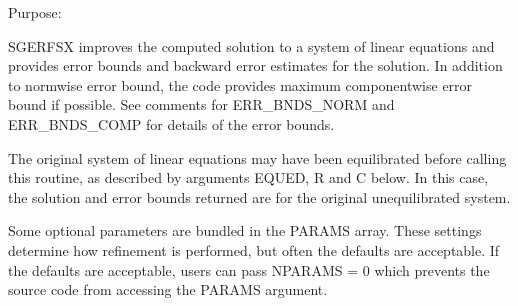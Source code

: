  \begin{DoxyParagraph}{Purpose\+: }
\begin{DoxyVerb}    SGERFSX improves the computed solution to a system of linear
    equations and provides error bounds and backward error estimates
    for the solution.  In addition to normwise error bound, the code
    provides maximum componentwise error bound if possible.  See
    comments for ERR_BNDS_NORM and ERR_BNDS_COMP for details of the
    error bounds.

    The original system of linear equations may have been equilibrated
    before calling this routine, as described by arguments EQUED, R
    and C below. In this case, the solution and error bounds returned
    are for the original unequilibrated system.\end{DoxyVerb}
 \begin{DoxyVerb}     Some optional parameters are bundled in the PARAMS array.  These
     settings determine how refinement is performed, but often the
     defaults are acceptable.  If the defaults are acceptable, users
     can pass NPARAMS = 0 which prevents the source code from accessing
     the PARAMS argument.\end{DoxyVerb}

\end{DoxyParagraph}

